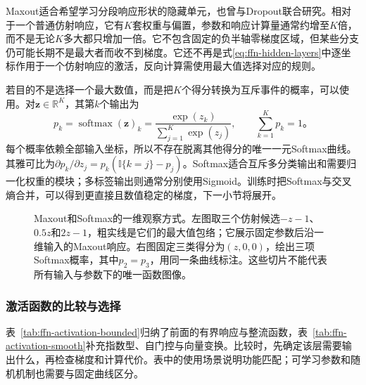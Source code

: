 Maxout适合希望学习分段响应形状的隐藏单元，也曾与Dropout联合研究。相对于一个普通仿射响应，它有$K$套权重与偏置，参数和响应计算量通常约增至$K$倍，而不是无论$K$多大都只增加一倍。它不包含固定的负半轴零梯度区域，但某些分支仍可能长期不是最大者而收不到梯度。它还不再是式\eqref{eq:ffn-hidden-layers}中逐坐标作用于一个仿射响应的激活，反向计算需使用最大值选择对应的规则。

若目的不是选择一个最大数值，而是把$K$个得分转换为互斥事件的概率，可以使用。对$\bm{z}\in\mathbb{R}^{K}$，其第$k$个输出为
\begin{equation}
  p_k=\operatorname{softmax}(\bm{z})_k
  =\frac{\exp(z_k)}{\sum_{j=1}^{K}\exp(z_j)},
  \qquad \sum_{k=1}^{K}p_k=1\text{。}
  \label{eq:ffn-softmax-activation}
\end{equation}
每个概率依赖全部输入坐标，所以不存在脱离其他得分的唯一一元Softmax曲线。其雅可比为$\partial p_k/\partial z_j=p_k(\mathbb{I}\{k=j\}-p_j)$。Softmax适合互斥多分类输出和需要归一化权重的模块；多标签输出则通常分别使用Sigmoid。训练时把Softmax与交叉熵合并，可以得到更直接且数值稳定的梯度，下一小节将展开。

\begin{figure}[htb]
  \centering
  
  \caption{Maxout和Softmax的一维观察方式。左图取三个仿射候选$-z-1$、$0.5z$和$2z-1$，粗实线是它们的最大值包络；它展示固定参数后沿一维输入的Maxout响应。右图固定三类得分为$(z,0,0)$，绘出三项Softmax概率，其中$p_2=p_3$，用同一条曲线标注。这些切片不能代表所有输入与参数下的唯一函数图像。}
  \label{fig:ffn-activation-vector}
\end{figure}

\subsubsection{激活函数的比较与选择}
\label{sec:ffn-activation-selection}

表~\ref{tab:ffn-activation-bounded}归纳了前面的有界响应与整流函数，表~\ref{tab:ffn-activation-smooth}补充指数型、自门控与向量变换。比较时，先确定该层需要输出什么，再检查梯度和计算代价。表中的使用场景说明功能匹配；可学习参数和随机机制也需要与固定曲线区分。



